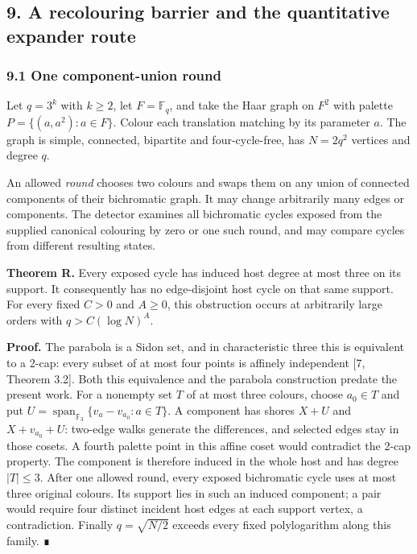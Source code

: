 \documentclass[
  11pt,
]{article}
\newcounter{none} %
\begin{document}
\subsection{9. A recolouring barrier and the quantitative expander
route}\label{a-recolouring-barrier-and-the-quantitative-expander-route}

\subsubsection{9.1 One component-union
round}\label{one-component-union-round}

Let \(q=3^k\) with \(k\geq2\), let \(F=\mathbb F_q\), and take the Haar
graph on \(F^2\) with palette \(P=\{(a,a^2):a\in F\}\). Colour each
translation matching by its parameter \(a\). The graph is simple,
connected, bipartite and four-cycle-free, has \(N=2q^2\) vertices and
degree \(q\).

An allowed \emph{round} chooses two colours and swaps them on any union
of connected components of their bichromatic graph. It may change
arbitrarily many edges or components. The detector examines all
bichromatic cycles exposed from the supplied canonical colouring by zero
or one such round, and may compare cycles from different resulting
states.

\textbf{Theorem R.} Every exposed cycle has induced host degree at most
three on its support. It consequently has no edge-disjoint host cycle on
that same support. For every fixed \(C>0\) and \(A\geq0\), this
obstruction occurs at arbitrarily large orders with \(q>C(\log N)^A\).

\textbf{Proof.} The parabola is a Sidon set, and in characteristic three
this is equivalent to a 2-cap: every subset of at most four points is
affinely independent {[}7, Theorem 3.2{]}. Both this equivalence and the
parabola construction predate the present work. For a nonempty set \(T\)
of at most three colours, choose \(a_0\in T\) and put
\(U=\operatorname{span}_{\mathbb F_3}\{v_a-v_{a_0}:a\in T\}\). A
component has shores \(X+U\) and \(X+v_{a_0}+U\): two-edge walks
generate the differences, and selected edges stay in those cosets. A
fourth palette point in this affine coset would contradict the 2-cap
property. The component is therefore induced in the whole host and has
degree \(|T|\leq3\). After one allowed round, every exposed bichromatic
cycle uses at most three original colours. Its support lies in such an
induced component; a pair would require four distinct incident host
edges at each support vertex, a contradiction. Finally \(q=\sqrt{N/2}\)
exceeds every fixed polylogarithm along this family. ∎
\end{document}
